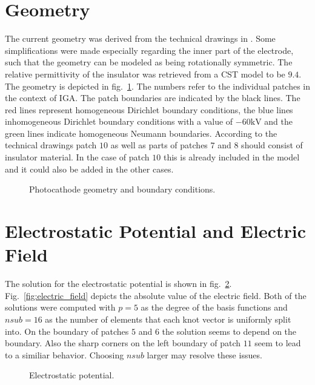 \section{Geometry}
The current geometry was derived from the technical drawings in \cite{thesis}. Some simplifications were made especially regarding the inner part of the electrode, such that the geometry can be modeled as being rotationally symmetric. The relative permittivity of the insulator was retrieved from a CST model to be $9.4$.
The geometry is depicted in fig.~\ref{fig:geometry}. The numbers refer to the individual patches in the context of IGA. The patch boundaries are indicated by the black lines. The red lines represent homogeneous Dirichlet boundary conditions, the blue lines inhomogeneous Dirichlet boundary conditions with a value of $-60 \mathrm{kV}$ and the green lines indicate homogeneous Neumann boundaries.
According to the technical drawings patch $10$ as well as parts of patches $7$ and $8$ should consist of insulator material. In the case of patch $10$ this is already included in the model and it could also be added in the other cases.

\begin{center}
\begin{figure}[H]
  
  \caption{Photocathode geometry and boundary conditions.}
  \label{fig:geometry}
\end{figure}
\end{center}

\section{Electrostatic Potential and Electric Field}
The solution for the electrostatic potential is shown in fig.~\ref{fig:potential}. Fig.~\ref{fig:electric_field} depicts the absolute value of the electric field.
Both of the solutions were computed with $p=5$ as the degree of the basis functions and $nsub=16$ as the number of elements that each knot vector is uniformly split into.
On the boundary of patches $5$ and $6$ the solution seems to depend on the boundary. Also the sharp corners on the left boundary of patch $11$ seem to lead to a similiar behavior. Choosing $nsub$ larger may resolve these issues.

\begin{center}
\begin{figure}[H]
  
  \caption{Electrostatic potential.}
  \label{fig:potential}
\end{figure}
\end{center}

